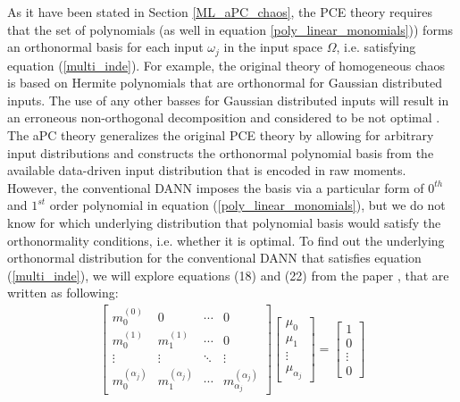 \documentclass[a4paper,fleqn]{article}
\newcommand{\rw}[1]{\textcolor{blue}{#1}}
\renewcommand{\rw}[1]{#1}
\begin{document}
\rw{As it have been stated in Section \ref{ML_aPC_chaos}, the PCE theory requires that the set of polynomials (as well in equation \ref{poly_linear_monomials})) forms an orthonormal basis for each input $\omega_j$ in the input space $\Omega$, i.e. satisfying equation (\ref{multi_inde}). For example, the original theory of homogeneous chaos \cite{Wiener1938} is based on Hermite polynomials that are orthonormal for Gaussian distributed inputs. The use of any other basses for Gaussian distributed inputs will result in an erroneous non-orthogonal decomposition and considered to be not optimal \rw{\cite{OladNowak_RESS2012,MR3364576}}}. The aPC theory \cite{OladNowak_RESS2012} \rw{generalizes the original PCE theory by allowing for arbitrary input distributions and} constructs the orthonormal polynomial basis from the available data-driven input distribution \rw{that is encoded in raw moments}. \rw{However, the conventional DANN imposes the basis via a particular form of $0^{th}$ and $1^{st}$ order polynomial in equation (\ref{poly_linear_monomials})}, but we do not know for which underlying distribution that polynomial basis would satisfy the orthonormality conditions, i.e. whether it is optimal. To find out the  underlying \rw{orthonormal} distribution \rw{for the conventional DANN that satisfies equation (\ref{multi_inde})}, we will explore equations (18) and (22) from the paper \cite{oladyshkin2018incomplete}\rw{, that are written as following:
\begin{eqnarray}
\begin{bmatrix}
m_0^{(0)} & 0 & \cdots & 0 \\
m_0^{(1)} & m_1^{(1)} & \cdots & 0 \\
\vdots & \vdots & \ddots & \vdots \\
m_0^{(\alpha_j)} & m_1^{(\alpha_j)} &\cdots & m_{\alpha_j}^{(\alpha_j)}
\end{bmatrix}
\begin{bmatrix}
\mu_0 \\ \mu_1 \\ \vdots \\ \mu_{\alpha_j}
\end{bmatrix}
=
\begin{bmatrix}
1\\ 0 \\ \vdots \\ 0

\end{bmatrix}
\end{eqnarray}}
\end{document}
